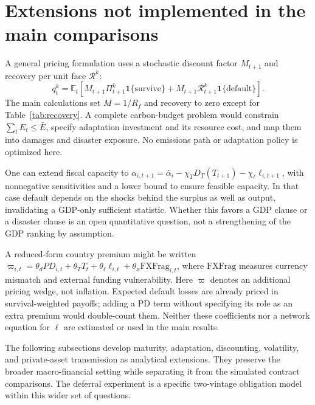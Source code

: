\documentclass[11pt]{article}
\newcommand{\E}{\mathbb E}
\newcommand{\ind}{\mathbf 1}
\begin{document}
\section{Extensions not implemented in the main comparisons}\label{app:extensions}
A general pricing formulation uses a stochastic discount factor $M_{t+1}$ and recovery per unit face $\mathcal R^k$:
\begin{equation}\label{eq:sdf}
 q_t^k=\E_t[M_{t+1}\Pi^k_{t+1}\ind\{\text{survive}\}
            +M_{t+1}\mathcal R^k_{t+1}\ind\{\text{default}\}].
\end{equation}
The main calculations set $M=1/R_f$ and recovery to zero except for Table~\ref{tab:recovery}. A complete carbon-budget problem would constrain $\sum_tE_t\le\bar E$, specify adaptation investment and its resource cost, and map them into damages and disaster exposure. No emissions path or adaptation policy is optimized here.

One can extend fiscal capacity to $\alpha_{i,t+1}=\bar\alpha_i-\chi_TD_T(T_{t+1})-\chi_\ell\ell_{i,t+1}$, with nonnegative sensitivities and a lower bound to ensure feasible capacity. In that case default depends on the shocks behind the surplus as well as output, invalidating a GDP-only sufficient statistic. Whether this favors a GDP clause or a disaster clause is an open quantitative question, not a strengthening of the GDP ranking by assumption.

A reduced-form country premium might be written $\varpi_{i,t}=\theta_dPD_{i,t}+\theta_TT_t+\theta_\ell\ell_{i,t}+\theta_x\mathrm{FXFrag}_{i,t}$, where $\mathrm{FXFrag}$ measures currency mismatch and external funding vulnerability. Here $\varpi$ denotes an additional pricing wedge, not inflation. Expected default losses are already priced in survival-weighted payoffs; adding a PD term without specifying its role as an extra premium would double-count them. Neither these coefficients nor a network equation for $\ell$ are estimated or used in the main results.

The following subsections develop maturity, adaptation, discounting, volatility, and private-asset transmission as analytical extensions. They preserve the broader macro-financial setting while separating it from the simulated contract comparisons. The deferral experiment is a specific two-vintage obligation model within this wider set of questions.


\end{document}
